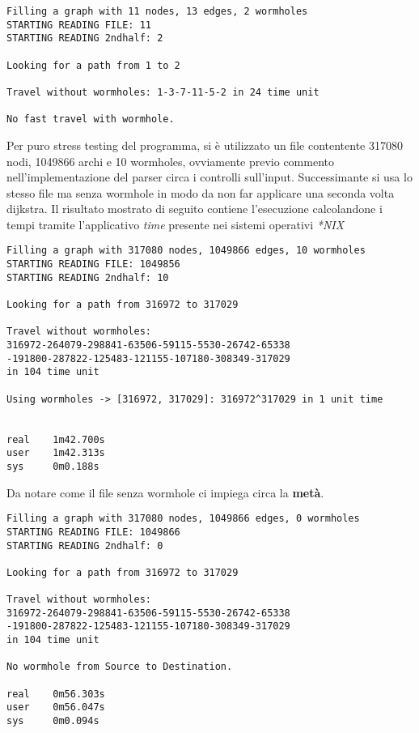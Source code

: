 \begin{verbatim}
Filling a graph with 11 nodes, 13 edges, 2 wormholes
STARTING READING FILE: 11
STARTING READING 2ndhalf: 2

Looking for a path from 1 to 2

Travel without wormholes: 1-3-7-11-5-2 in 24 time unit

No fast travel with wormhole.
\end{verbatim}




\newpage Per puro stress testing del programma, si \`e utilizzato un file contentente
317080 nodi, 1049866 archi e 10 wormholes, ovviamente previo
commento nell'implementazione
del parser circa i controlli sull'input. Successimante si usa lo stesso file ma senza
wormhole in modo da non far applicare una seconda volta dijkstra.
Il risultato mostrato di seguito contiene l'esecuzione calcolandone i tempi tramite
l'applicativo \emph{time} presente nei sistemi operativi \emph{*NIX}

\begin{verbatim}
Filling a graph with 317080 nodes, 1049866 edges, 10 wormholes
STARTING READING FILE: 1049856
STARTING READING 2ndhalf: 10

Looking for a path from 316972 to 317029

Travel without wormholes:
316972-264079-298841-63506-59115-5530-26742-65338
-191800-287822-125483-121155-107180-308349-317029
in 104 time unit

Using wormholes -> [316972, 317029]: 316972^317029 in 1 unit time


real    1m42.700s
user    1m42.313s
sys     0m0.188s
\end{verbatim}
\newpage
Da notare come il file senza wormhole ci impiega circa la \textbf{met\`a}.

\begin{verbatim}
Filling a graph with 317080 nodes, 1049866 edges, 0 wormholes
STARTING READING FILE: 1049866
STARTING READING 2ndhalf: 0

Looking for a path from 316972 to 317029

Travel without wormholes:
316972-264079-298841-63506-59115-5530-26742-65338
-191800-287822-125483-121155-107180-308349-317029
in 104 time unit

No wormhole from Source to Destination.

real    0m56.303s
user    0m56.047s
sys     0m0.094s

\end{verbatim}

